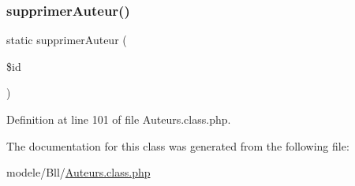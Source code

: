 \subsubsection{\texorpdfstring{supprimer\+Auteur()}{supprimerAuteur()}}
{\footnotesize\ttfamily static supprimer\+Auteur (\begin{DoxyParamCaption}\item[{}]{\$id }\end{DoxyParamCaption})\hspace{0.3cm}{\ttfamily [static]}}



Definition at line 101 of file Auteurs.\+class.\+php.



The documentation for this class was generated from the following file\+:\begin{DoxyCompactItemize}
\item 
modele/\+Bll/\hyperlink{_auteurs_8class_8php}{Auteurs.\+class.\+php}\end{DoxyCompactItemize}
